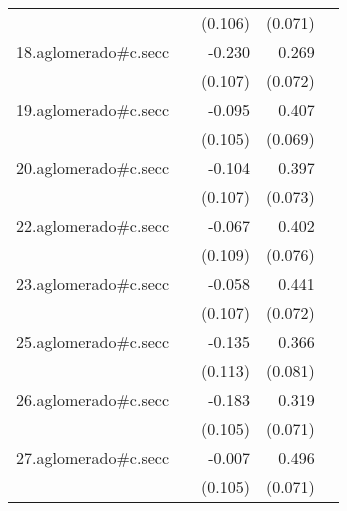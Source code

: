 {\begin{longtable}{l*{4}{D{.}{.}{-1}}}
            &                     &     (0.106)         &     (0.071)         &                     \\
\addlinespace
18.aglomerado#c.secc&                     &      -0.230\sym{*}  &       0.269\sym{***}&                     \\
            &                     &     (0.107)         &     (0.072)         &                     \\
\addlinespace
19.aglomerado#c.secc&                     &      -0.095         &       0.407\sym{***}&                     \\
            &                     &     (0.105)         &     (0.069)         &                     \\
\addlinespace
20.aglomerado#c.secc&                     &      -0.104         &       0.397\sym{***}&                     \\
            &                     &     (0.107)         &     (0.073)         &                     \\
\addlinespace
22.aglomerado#c.secc&                     &      -0.067         &       0.402\sym{***}&                     \\
            &                     &     (0.109)         &     (0.076)         &                     \\
\addlinespace
23.aglomerado#c.secc&                     &      -0.058         &       0.441\sym{***}&                     \\
            &                     &     (0.107)         &     (0.072)         &                     \\
\addlinespace
25.aglomerado#c.secc&                     &      -0.135         &       0.366\sym{***}&                     \\
            &                     &     (0.113)         &     (0.081)         &                     \\
\addlinespace
26.aglomerado#c.secc&                     &      -0.183         &       0.319\sym{***}&                     \\
            &                     &     (0.105)         &     (0.071)         &                     \\
\addlinespace
27.aglomerado#c.secc&                     &      -0.007         &       0.496\sym{***}&                     \\
            &                     &     (0.105)         &     (0.071)         &                     \\

\end{longtable}}
